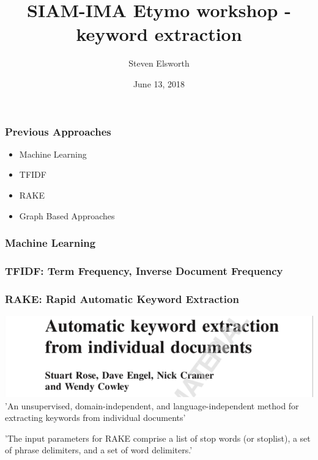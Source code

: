 \documentclass{beamer}
\title{SIAM-IMA Etymo workshop - keyword extraction}
\author{Steven Elsworth}
\date{June 13, 2018}
\begin{document}
\maketitle


\begin{frame}
\frametitle{Previous Approaches}
\begin{itemize}
\item Machine Learning
\item TFIDF
\item RAKE
\item Graph Based Approaches
\end{itemize}
\end{frame}

\begin{frame}
\frametitle{Machine Learning}
\end{frame}

\begin{frame}
\frametitle{TFIDF: Term Frequency, Inverse Document Frequency}
\end{frame}

\begin{frame}
\frametitle{RAKE: Rapid Automatic Keyword Extraction}
\includegraphics[width= \textwidth]{img/RAKE}
\vspace{1cm}
'An unsupervised, domain-independent, and language-independent method for extracting keywords from individual documents'
\vspace{0.5cm}

'The input parameters for RAKE comprise a list of stop words (or stoplist), a set of phrase delimiters, and a set of word delimiters.'
\end{frame}
\end{document}
